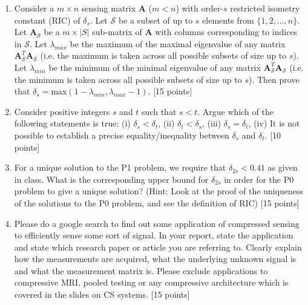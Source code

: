 \documentclass[11pt]{article}
\begin{document}
\begin{enumerate}
\item Consider a $m \times n$ sensing matrix $\boldsymbol{A}$ ($m < n$) with order-$s$ restricted isometry constant (RIC) of $\delta_s$. Let $\mathcal{S}$ be a subset of up to $s$ elements from $\{1,2,...,n\}$. Let $\boldsymbol{A}_{\mathcal{S}}$ be a $m  \times |S|$ sub-matrix of $\boldsymbol{A}$ with columns corresponding to indices in $\mathcal{S}$. Let $\lambda_{max}$ be the maximum of the maximal eigenvalue of any matrix $\boldsymbol{A}^T_{\mathcal{S}} \boldsymbol{A}_{\mathcal{S}}$ (i.e. the maximum is taken across all possible subsets of size up to $s$). Let $\lambda_{min}$ be the minimum of the minimal eigenvalue of any matrix $\boldsymbol{A}^T_{\mathcal{S}} \boldsymbol{A}_{\mathcal{S}}$ (i.e. the minimum is taken across all possible subsets of size up to $s$). Then prove that $\delta_s = \textrm{max}(1-\lambda_{min},\lambda_{max}-1)$. \textsf{[15 points]}

\item Consider positive integers $s$ and $t$ such that $s < t$. Argue which of the following statements is true: (i) $\delta_s < \delta_t$, (ii) $\delta_t < \delta_s$, (iii) $\delta_s = \delta_t$, (iv) It is not possible to establish a precise equality/inequality between $\delta_s$ and $\delta_t$. \textsf{[10 points]}

\item For a unique solution to the P1 problem, we require that $\delta_{2s} < 0.41$ as given in class. What is the corresponding upper bound for $\delta_{2s}$ in order for the P0 problem to give a unique solution? (Hint: Look at the proof of the uniqueness of the solutions to the P0 problem, and see the definition of RIC) \textsf{[15 points]}

\item Please do a google search to find out some application of compressed sensing to efficiently sense some sort of signal. In your report, state the application and state which research paper or article you are referring to. Clearly explain how the measurements are acquired, what the underlying unknown signal is and what the measurement matrix is. Please exclude applications to compressive MRI, pooled testing or any compressive architecture which is covered in the slides on CS systems. 
\textsf{[15 points]}


\end{enumerate}
\end{document}
